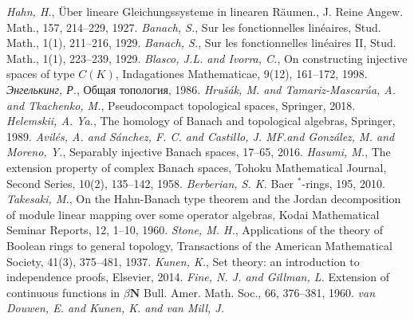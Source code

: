 \documentclass[12pt]{article}
\begin{document}
\begin{thebibliography}{999}
    \textit{Hahn, H.}, {\"U}ber lineare Gleichungssysteme in linearen
    R{\"a}umen., J. Reine Angew. Math., 157, 214--229, 1927.
    \textit{Banach, S.}, Sur les fonctionnelles lin{\'e}aires, Stud. Math.,
    1(1), 211--216, 1929.
    \textit{Banach, S.}, Sur les fonctionnelles lin{\'e}aires II, Stud. Math.,
    1(1), 223--239, 1929.
    \textit{Blasco, J.L. and Ivorra, C.}, On constructing injective spaces of
    type $C(K)$, Indagationes Mathematicae, 9(12), 161--172, 1998.
    \textit{Энгелькинг, Р.}, Общая топология, 1986.
    \textit{Hru{\v{s}}{\'a}k, M. and Tamariz-Mascar{\'u}a, A. and Tkachenko,
    M.}, Pseudocompact topological spaces, Springer, 2018.
    \textit{Helemskii, A. Ya.}, The homology of Banach and topological algebras,
    Springer, 1989.
    \textit{
        Avil{\'e}s, A. and S{\'a}nchez, F. C. and Castillo, J. MF.\@ and
        Gonz{\'a}lez, M. and Moreno, Y.},
    Separably injective Banach spaces, 17--65, 2016.
    \textit{Hasumi, M.}, The extension property of complex Banach spaces, Tohoku
    Mathematical Journal, Second Series, 10(2), 135--142, 1958.
    \textit{Berberian, S. K.}
    Baer $^*$-rings, 195, 2010.
    \textit{Takesaki, M.}, On the Hahn-Banach type theorem and the Jordan
    decomposition of module linear mapping over some operator algebras, Kodai
    Mathematical Seminar Reports, 12, 1--10, 1960.
    \textit{Stone, M. H.}, Applications of the theory of Boolean rings to
    general topology, Transactions of the American Mathematical Society, 41(3),
    375--481, 1937.
    \textit{Kunen, K.}, Set theory: an introduction to independence proofs,
    Elsevier, 2014.
    \textit{Fine, N. J. and Gillman, L.}
    Extension of continuous functions in $\beta {\mathbf{N}}$ Bull. Amer. Math.
    Soc., 66, 376--381, 1960.
    \textit{van Douwen, E. and  Kunen,  K. and van Mill, J.}

\end{thebibliography}
\end{document}
